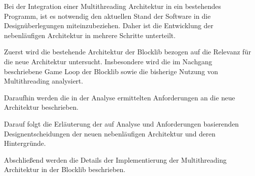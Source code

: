 Bei der Integration einer Multithreading Architektur in ein bestehendes \gls{Programm}, ist es notwendig den aktuellen Stand der Software in die Designüberlegungen miteinzubeziehen. Daher ist die Entwicklung der nebenläufigen Architektur in mehrere Schritte unterteilt.

Zuerst wird die bestehende Architektur der Blocklib bezogen auf die Relevanz für die neue Architektur untersucht. Insbesondere wird die im Nachgang beschriebene Game Loop der Blocklib sowie die bisherige Nutzung von Multithreading analysiert.

Daraufhin werden die in der Analyse ermittelten Anforderungen an die neue Architektur beschrieben.

Darauf folgt die Erläuterung der auf Analyse und Anforderungen basierenden Designentscheidungen der neuen nebenläufigen Architektur und deren Hintergründe.

Abschließend werden die Details der Implementierung der Multithreading Architektur in der Blocklib beschrieben.
